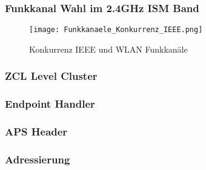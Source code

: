 \subsubsection{Funkkanal Wahl im 2.4GHz ISM Band}\label{subsubsec:FunkkanalWahlim2.4GHzISMBand}

\begin{figure}[h]
	\centering
	\texttt{[image: Funkkanaele\_Konkurrenz\_IEEE.png]}
	\caption{Konkurrenz IEEE und WLAN Funkkanäle \cite{markus_krause_rainer_konrad_drahtlose_2014}}
	\label{fig:KonkurrenzIEEEundWLANFunkkanäle}
\end{figure}

\subsubsection{ZCL Level Cluster}\label{subsubsec:ZCLLevelCluster}

\subsubsection{Endpoint Handler}\label{subsubsec:EndpointHandler}

\subsubsection{APS Header}\label{subsubsec:Header}

\subsubsection{Adressierung}\label{subsubsec:Adressierung}

